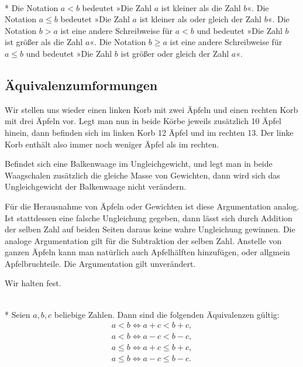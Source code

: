 \begin{Definition}[Ungleichungsrelation]\mbox{}\\*
Die Notation $a<b$ bedeutet »Die Zahl $a$ ist kleiner als
die Zahl $b$«. Die Notation $a\le b$ bedeutet »Die Zahl $a$
ist kleiner als oder gleich der Zahl $b$«. Die Notation
$b>a$ ist eine andere Schreibweise für $a<b$ und bedeutet
»Die Zahl $b$ ist größer als die Zahl $a$«. Die Notation
$b\ge a$ ist eine andere Schreibweise für $a\le b$ und
bedeutet »Die Zahl $b$ ist größer oder gleich der Zahl $a$«.
\end{Definition}

\subsection{Äquivalenzumformungen}%

Wir stellen uns wieder einen linken Korb mit zwei Äpfeln und
einen rechten Korb mit drei Äpfeln vor. Legt man nun in beide
Körbe jeweils zusätzlich 10 Äpfel hinein, dann befinden sich
im linken Korb 12 Äpfel und im rechten 13. Der linke Korb
enthält also immer noch weniger Äpfel als im rechten.

Befindet sich eine Balkenwaage im Ungleichgewicht, und legt man
in beide Waagschalen zusätzlich die gleiche Masse von Gewichten,
dann wird sich das Ungleichgewicht der Balkenwaage nicht verändern.

Für die Herausnahme von Äpfeln oder Gewichten ist diese Argumentation
analog. Ist stattdessen eine falsche Ungleichung gegeben,
dann lässt sich durch Addition der selben Zahl auf beiden Seiten
daraus keine wahre Ungleichung gewinnen. Die analoge Argumentation
gilt für die Subtraktion der selben Zahl. Anstelle von ganzen
Äpfeln kann man natürlich auch Apfelhälften hinzufügen, oder
allgmein Apfelbruchteile. Die Argumentation gilt unverändert.

Wir halten fest. 

\begin{Satz}\mbox{}\\*
Seien $a,b,c$ beliebige Zahlen. Dann sind die folgenden
Äquivalenzen gültig:
\begin{gather}
\label{lt-add} a<b\iff a+c<b+c,\\
\label{lt-sub} a<b\iff a-c<b-c,\\
\label{le-add} a\le b\iff a+c\le b+c,\\
\label{le-sub} a\le b\iff a-c\le b-c.
\end{gather}
\end{Satz}

